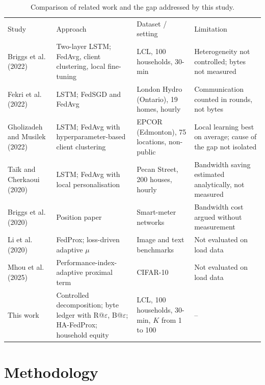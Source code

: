 \begin{table}
\caption{Comparison of related work and the gap addressed by this study.}\label{tab:gap}
\begin{tabular}{llll}
Study & Approach & Dataset / setting & Limitation \\
Briggs et al. (2022)~\cite{briggs2022} & Two-layer LSTM; FedAvg, client clustering, local fine-tuning & LCL, 100 households, 30-min & Heterogeneity not controlled; bytes not measured \\
Fekri et al. (2022)~\cite{fekri2022} & LSTM; FedSGD and FedAvg & London Hydro (Ontario), 19 homes, hourly & Communication counted in rounds, not bytes \\
Gholizadeh and Musilek (2022)~\cite{gholizadeh2022} & LSTM; FedAvg with hyperparameter-based client clustering & EPCOR (Edmonton), 75 locations, non-public & Local learning best on average; cause of the gap not isolated \\
Taïk and Cherkaoui (2020)~\cite{taik2020} & LSTM; FedAvg with local personalisation & Pecan Street, 200 houses, hourly & Bandwidth saving estimated analytically, not measured \\
Briggs et al. (2020)~\cite{briggs2020ccai} & Position paper & Smart-meter networks & Bandwidth cost argued without measurement \\
Li et al. (2020)~\cite{li2020fedprox} & FedProx; loss-driven adaptive $\mu$ & Image and text benchmarks & Not evaluated on load data \\
Mhou et al. (2025)~\cite{mhou2025hapi} & Performance-index-adaptive proximal term & CIFAR-10 & Not evaluated on load data \\
This work & Controlled decomposition; byte ledger with R@$\varepsilon$, B@$\varepsilon$; HA-FedProx; household equity & LCL, 100 households, 30-min, $K$ from 1 to 100 & -- \\
\end{tabular}
\end{table}

\section{Methodology}


